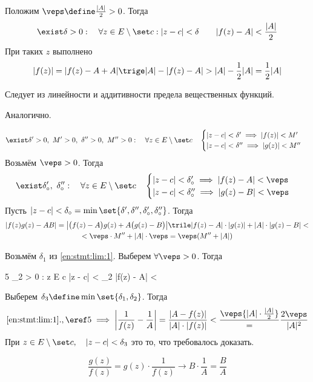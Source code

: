 \begin{eproof}
	\item Положим $ \veps \define \frac{|A|}2 > 0 $. Тогда
	$$ \exist \delta > 0 : \quad \forall z \in E \setminus \set c : |z - c| < \delta \qquad |f(z) - A| < \frac{|A|}2 $$
	При таких $ z $ выполнено
	$$ |f(z)| = |f(z) - A + A| \trige |A| - |f(z) - A| > |A| - \frac12 |A| = \frac12 |A| $$

	\item Следует из линейности и аддитивности предела вещественных функций.

	\item Аналогично.

	\item
	$$ \exist \delta' > 0, ~ M' > 0, ~ \delta'' > 0, ~ M'' > 0 : \quad \forall z \in E \setminus \set c \quad
	\begin{cases}
		|z - c| < \delta' \implies |f(z)| < M' \\
		|z - c| < \delta'' \implies |g(z)| < M''
	\end{cases} $$
	Возьмём $ \veps > 0 $. Тогда
	$$ \exist \delta_\circ', ~ \delta_\circ'' : \quad \forall z \in E \setminus \set c \quad
	\begin{cases}
		|z - c| < \delta_\circ' \implies |f(z) - A| < \veps \\
		|z - c| < \delta_\circ'' \implies |g(z) - B| < \veps
	\end{cases} $$
	Пусть $ |z - c| < \delta_\circ = \min\set{\delta', \delta'', \delta_\circ', \delta_\circ''} $. Тогда
	\begin{multline*}
		|f(z)g(z) - AB| = \big| \big( f(z) - A \big)g(z) + A \big( g(z) - B \big) \big| \trile |f(z) - A| \cdot |g(z)| + |A| \cdot |g(z) - B| < \\
		< \veps \cdot M'' + |A| \cdot \veps = \veps(M'' + |A|)
	\end{multline*}

	\item Возьмём $ \delta_1 $ из \ref{en:stmt:lim:1}. Выберем $ \forall \veps > 0 $. Тогда
	\begin{equ}5
		\exist \delta_2 > 0 : \quad \forall z \in E \setminus \set c \quad |z - c| < \delta_2 \implies |f(z) - A| < \veps
	\end{equ}
	Выберем $ \delta_3 \define \min\set{\delta_1, \delta_2} $. Тогда
	$$ \ref{en:stmt:lim:1}., \eref5 \implies \bigg| \frac1{f(z)} - \frac1A \bigg| = \frac{|A - f(z)|}{|A| \cdot |f(z)|} < \frac\veps{|A| \cdot \frac{|A|}2} = \frac{2\veps}{|A|^2} $$
	При $ z \in E \setminus \set c, \quad |z - c| < \delta_3 $ это то, что требовалось доказать.

	\item
	$$ \frac{g(z)}{f(z)} = g(z) \cdot \frac1{f(z)} \to B \cdot \frac1A = \frac BA $$
\end{eproof}

